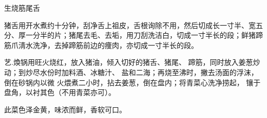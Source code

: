 \begin{recipe}{生烧筋尾舌}

\ingredients


\cooking

\step 猪舌用开水煮约十分钟，刮净舌上祖皮，舌根询除不用，然后切成长一寸半、宽五分、厚一分半的片；猪尾去毛、去垢，用刀刮洗洁白，切成一寸半长的段；鲜猪蹄筋爪淸水洗净，去掉蹄筋前边的痩肉，亦切成一寸半长的段。

艺.煥锅用旺火烧红，放入猪油，倾入切好的猪舌、猪尾、 蹄筋，同时放入姜葱炒动；到炒尽水份时加料酒、冰糖汁、 盐和二海；再烧至沸时，撇去汤面的浮沫，倒在砂锅内以微 火煨煮二小时，拈去姜葱，倒在盘内；将青菜心洗净捞起， 镶于盘角，以衬其色（不用青菜亦可）。

\notes

此菜色泽金黄，味浓而鲜，香软可口。

\end{recipe}


